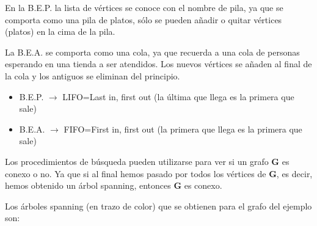 \documentclass[ebook,oneside]{memoir}
\newcommand{\bolds}[1]{\boldsymbol{#1}}
\begin{document}
\vspace{0.2cm}
        En la B.E.P. la lista de v\'{e}rtices se conoce con el nombre de pila, ya que se comporta como una pila de platos,
        s\'{o}lo se pueden a\~{n}adir o quitar v\'{e}rtices (platos) en la cima de la pila.
\vspace{0.2cm}

        La B.E.A. se comporta como una cola, ya que recuerda a una cola de personas esperando en una tienda a ser atendidos. Los nuevos
        v\'{e}rtices se a\~{n}aden al final de la cola y los antiguos se eliminan del principio.
\vspace{0.2cm}

        \begin{itemize}
            \item B.E.P. $\rightarrow$ LIFO=Last in, first out (la \'{u}ltima que llega es la primera que sale)
            \item B.E.A. $\rightarrow$ FIFO=First in, first out (la primera que llega es la primera que sale)
        \end{itemize}

\vspace{0.2cm}
Los procedimientos de b\'{u}squeda pueden u\-ti\-li\-zar\-se para ver si un grafo $\bolds{G}$ es conexo o no. Ya que si al final hemos pasado por todos
los v\'{e}rtices de $\bolds{G}$, es decir, hemos obtenido un \'{a}rbol spanning, entonces $\bolds{G}$ es conexo.

\vspace{0.2cm}
Los \'{a}rboles spanning (en trazo de color) que se obtienen para el grafo del ejemplo son:
\end{document}
